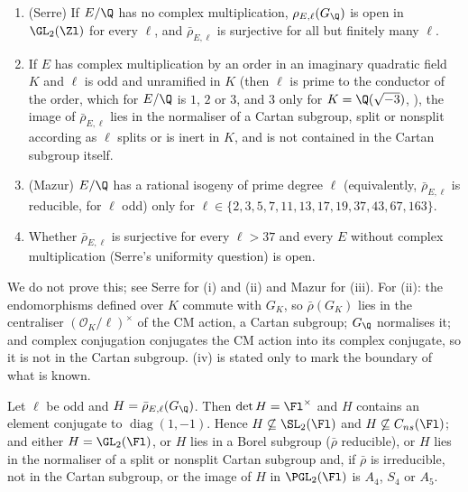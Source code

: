 \begin{theorem}\label{thm:galrep:open-image}
\begin{enumerate}[label=(\roman*)]
\item (Serre) If $E/\Q$ has no complex multiplication, $\rho_{E,\ell}(G_\Q)$ is open in $\GL_2(\Zl)$ for every $\ell$, and $\bar\rho_{E,\ell}$ is surjective for all but
finitely many $\ell$.
\item If $E$ has complex multiplication by an order in an imaginary quadratic field $K$ and $\ell$ is odd and unramified in $K$ (then $\ell$ is prime to
the conductor of the order, which for $E/\Q$ is $1$, $2$ or $3$, and $3$ only for $K=\Q(\sqrt{-3})$, ), the image of
$\bar\rho_{E,\ell}$ lies in the normaliser of a Cartan subgroup, split or nonsplit according as $\ell$ splits or is inert in $K$, and is not contained
in the Cartan subgroup itself.
\item (Mazur) $E/\Q$ has a rational isogeny of prime degree $\ell$ (equivalently, $\bar\rho_{E,\ell}$ is reducible, for $\ell$ odd) only for
$\ell\in\{2,3,5,7,11,13,17,19,37,43,67,163\}$.
\item Whether $\bar\rho_{E,\ell}$ is surjective for every $\ell>37$ and every $E$ without complex multiplication (Serre's uniformity question) is open.
\end{enumerate}
\end{theorem}

We do not prove this; see Serre \cite{Serre72} for (i) and (ii) and Mazur \cite{Mazur78} for (iii). For (ii): the endomorphisms defined over $K$
commute with $G_K$, so $\bar\rho(G_K)$ lies in the centraliser $(\mathcal O_K/\ell)^\times$ of the CM action, a Cartan subgroup; $G_\Q$ normalises it; and
complex conjugation conjugates the CM action into its complex conjugate, so it is not in the Cartan subgroup. (iv) is stated only to mark the
boundary of what is known.

\begin{proposition}\label{prop:galrep:image-constraints}
Let $\ell$ be odd and $H=\bar\rho_{E,\ell}(G_\Q)$. Then $\det H=\Fl^\times$ and $H$ contains an element conjugate to $\operatorname{diag}(1,-1)$. Hence $H\not\subseteq\SL_2(\Fl)$ and
$H\not\subseteq C_{ns}(\Fl)$; and either $H=\GL_2(\Fl)$, or $H$ lies in a Borel subgroup ($\bar\rho$ reducible), or $H$ lies in the normaliser of a split or nonsplit
Cartan subgroup and, if $\bar\rho$ is irreducible, not in the Cartan subgroup, or the image of $H$ in $\PGL_2(\Fl)$ is $A_4$, $S_4$ or $A_5$.
\end{proposition}

